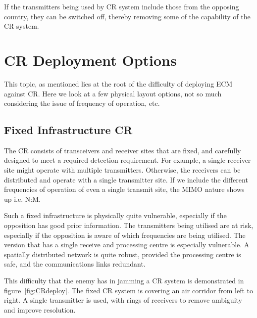 \documentclass[english, 12pt]{report}
\begin{document}
If the transmitters being used by CR system include those from the opposing country, they can be switched off, thereby removing some of the capability of the CR system.

\section{CR Deployment Options}

This topic, as mentioned lies at the root of the difficulty of deploying ECM against CR. Here we look at a few physical layout options, not so much considering the issue of frequency of operation, etc.

\subsection{Fixed Infrastructure CR}

The CR consists of transceivers and receiver sites that are fixed, and carefully designed to meet a required detection requirement. For example, a single receiver site might operate with multiple transmitters. Otherwise, the receivers can be distributed and operate with a single transmitter site. If we include the different frequencies of operation of even a single transmit site, the MIMO nature shows up i.e. N:M.

Such a fixed infrastructure is physically quite vulnerable, especially if the opposition has good prior information. The transmitters being utilised are at risk, especially if the opposition is aware of which frequencies are being utilised. The version that has a single receive and processing centre is especially vulnerable. A spatially distributed network is quite robust, provided the processing centre is safe, and the communications links redundant.

This difficulty that the enemy has in jamming a CR system is demonstrated in figure~\ref{fig:CRdeploy}. The fixed CR system is covering an air corridor from left to right. A single transmitter is used, with rings of receivers to remove ambiguity and improve resolution.
\end{document}
